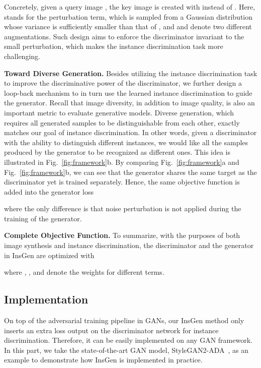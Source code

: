\documentclass{article}
\begin{document}
Concretely, given a query image , the key image  is created with  instead of .
Here,  stands for the perturbation term, which is sampled from a Gaussian distribution whose variance is sufficiently smaller than that of ,
and  and  denote two different augmentations.
Such design aims to enforce the discriminator invariant to the small perturbation, which makes the instance discrimination task more challenging.


\textbf{Toward Diverse Generation.}
Besides utilizing the instance discrimination task to improve the discriminative power of the discriminator, we further design a loop-back mechanism to in turn use the learned instance discrimination to guide the generator.
Recall that image diversity, in addition to image quality, is also an important metric to evaluate generative models.
Diverse generation, which requires all generated samples to be distinguishable from each other, exactly matches our goal of instance discrimination.
In other words, given a discriminator with the ability to distinguish different instances, we would like all the samples produced by the generator to be recognized as different ones.
This idea is illustrated in Fig.~\ref{fig:framework}b.
By comparing Fig.~\ref{fig:framework}a and Fig.~\ref{fig:framework}b, we can see that the generator shares the same target as the discriminator yet is trained separately.
Hence, the same objective function is added into the generator loss

where the only difference is that noise perturbation is not applied during the training of the generator.


\textbf{Complete Objective Function.}
To summarize, with the purposes of both image synthesis and instance discrimination, the discriminator and the generator in InsGen are optimized with

where , , and  denote the weights for different terms.


\subsection{Implementation}\label{subsec:usage}


On top of the adversarial training pipeline in GANs, our InsGen method only inserts an extra loss output on the discriminator network for instance discrimination.
Therefore, it can be easily implemented on any GAN framework.
In this part, we take the state-of-the-art GAN model, StyleGAN2-ADA~\cite{karras2020training}, as an example to demonstrate how InsGen is implemented in practice.
\end{document}
